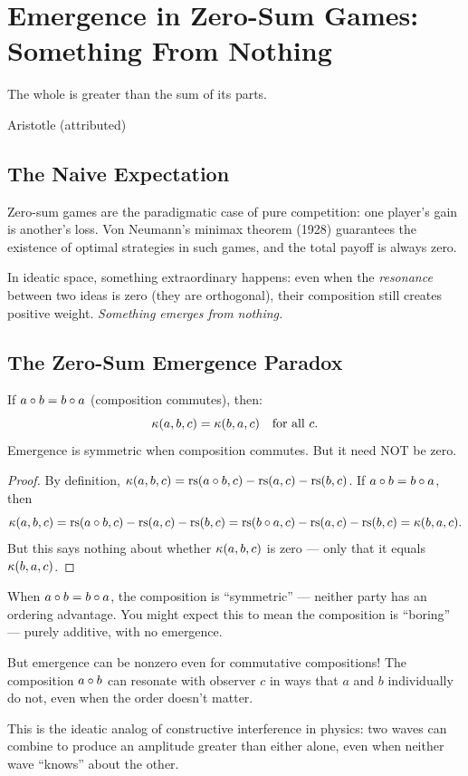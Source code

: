 \chapter{Emergence in Zero-Sum Games: Something From Nothing}

\epigraph{The whole is greater than the sum of its parts.}{Aristotle (attributed)}

\section{The Naive Expectation}

Zero-sum games are the paradigmatic case of pure competition: one player's gain is another's loss. Von Neumann's minimax theorem (1928) guarantees the existence of optimal strategies in such games, and the total payoff is always zero.

In ideatic space, something extraordinary happens: even when the \emph{resonance} between two ideas is zero (they are orthogonal), their composition still creates positive weight. \emph{Something emerges from nothing.}

\section{The Zero-Sum Emergence Paradox}

\begin{theorem}
\label{thm:zero-sum-emergence}
If $a \circ b = b \circ a$ (composition commutes), then:
\[
\kappa(a,b,c) = \kappa(b,a,c) \quad \text{for all } c.
\]
Emergence is symmetric when composition commutes. But it need NOT be zero.
\end{theorem}

\begin{proof}
By definition, $\kappa(a,b,c) = \operatorname{rs}(a \circ b, c) - \operatorname{rs}(a,c) - \operatorname{rs}(b,c)$. If $a \circ b = b \circ a$, then
\[
\kappa(a,b,c) = \operatorname{rs}(a \circ b, c) - \operatorname{rs}(a,c) - \operatorname{rs}(b,c) = \operatorname{rs}(b \circ a, c) - \operatorname{rs}(a,c) - \operatorname{rs}(b,c) = \kappa(b,a,c).
\]
But this says nothing about whether $\kappa(a,b,c)$ is zero --- only that it equals $\kappa(b,a,c)$.
\end{proof}

\begin{paradox}
When $a \circ b = b \circ a$, the composition is ``symmetric'' --- neither party has an ordering advantage. You might expect this to mean the composition is ``boring'' --- purely additive, with no emergence.

But emergence can be nonzero even for commutative compositions! The composition $a \circ b$ can resonate with observer $c$ in ways that $a$ and $b$ individually do not, even when the order doesn't matter.

This is the ideatic analog of constructive interference in physics: two waves can combine to produce an amplitude greater than either alone, even when neither wave ``knows'' about the other.
\end{paradox}

